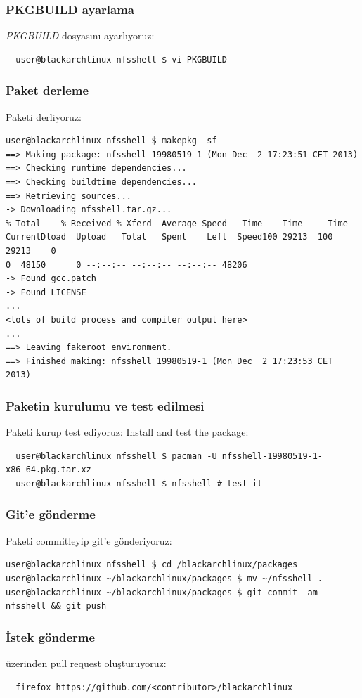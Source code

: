 \documentclass[a4paper, oneside, 11pt]{book}
\def\href#1#2{\htmladdnormallink{#2}{#1}}
\begin{document}
\subsubsection{PKGBUILD ayarlama}
\textit{PKGBUILD} dosyasını ayarlıyoruz:
\begin{lstlisting}
  user@blackarchlinux nfsshell $ vi PKGBUILD
\end{lstlisting}

\subsubsection{Paket derleme}
Paketi derliyoruz:
\begin{lstlisting}user@blackarchlinux nfsshell $ makepkg -sf
==> Making package: nfsshell 19980519-1 (Mon Dec  2 17:23:51 CET 2013)
==> Checking runtime dependencies...
==> Checking buildtime dependencies...
==> Retrieving sources...
-> Downloading nfsshell.tar.gz...
% Total    % Received % Xferd  Average Speed   Time    Time     Time
CurrentDload  Upload   Total   Spent    Left  Speed100 29213  100 29213    0
0  48150      0 --:--:-- --:--:-- --:--:-- 48206
-> Found gcc.patch
-> Found LICENSE
...
<lots of build process and compiler output here>
...
==> Leaving fakeroot environment.
==> Finished making: nfsshell 19980519-1 (Mon Dec  2 17:23:53 CET 2013)
\end{lstlisting}

\subsubsection{Paketin kurulumu ve test edilmesi}
Paketi kurup test ediyoruz:
Install and test the package:
\begin{lstlisting}
  user@blackarchlinux nfsshell $ pacman -U nfsshell-19980519-1-x86_64.pkg.tar.xz
  user@blackarchlinux nfsshell $ nfsshell # test it
\end{lstlisting}

\subsubsection{Git'e gönderme}
Paketi commitleyip git'e gönderiyoruz:
\begin{lstlisting}user@blackarchlinux nfsshell $ cd /blackarchlinux/packages
user@blackarchlinux ~/blackarchlinux/packages $ mv ~/nfsshell .
user@blackarchlinux ~/blackarchlinux/packages $ git commit -am nfsshell && git push
\end{lstlisting}

\subsubsection{İstek gönderme}
\href{https://github.com/}{github.com} üzerinden pull request oluşturuyoruz:
\begin{lstlisting}
  firefox https://github.com/<contributor>/blackarchlinux
\end{lstlisting}
\end{document}
